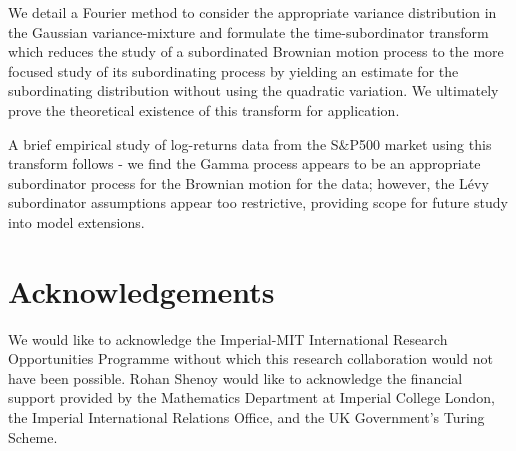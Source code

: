 \documentclass{article}
\begin{document}
We detail a Fourier method to consider the appropriate variance distribution in the Gaussian variance-mixture and formulate the time-subordinator transform which reduces the study of a subordinated Brownian motion process to the more focused study of its subordinating process by yielding an estimate for the subordinating distribution without using the quadratic variation. We ultimately prove the theoretical existence of this transform for application.

A brief empirical study of log-returns data from the S$\&$P500 market using this transform follows - we find the Gamma process appears to be an appropriate subordinator process for the Brownian motion for the data; however, the Lévy subordinator assumptions appear too restrictive, providing scope for future study into model extensions.



\section*{Acknowledgements}
We would like to acknowledge the Imperial-MIT International Research Opportunities Programme without which this research collaboration would not have been possible. Rohan Shenoy would like to acknowledge the financial support provided by the Mathematics Department at Imperial College London, the Imperial International Relations Office, and the UK Government's Turing Scheme.




% 
\end{document}
